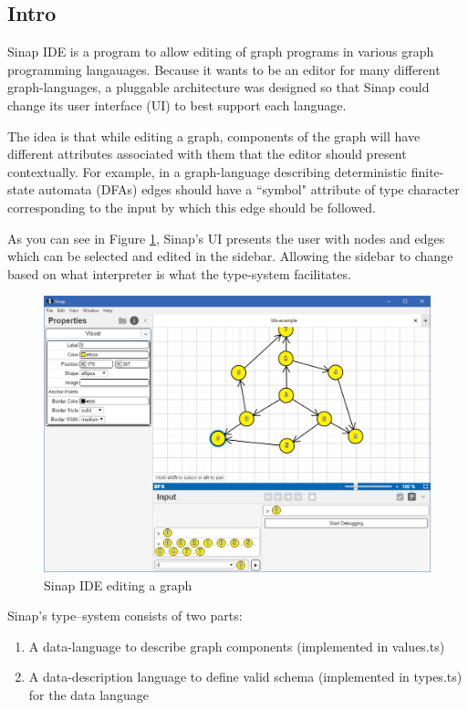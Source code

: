 \documentclass{article}
\begin{document}
\begin{multicols}{2}
\section{Intro}

Sinap IDE is a program to allow editing of graph
programs in various graph programming langauages. 
Because it wants to be an editor for many different
graph-languages, a pluggable architecture was designed
so that Sinap could change its user interface (UI)
to best support each language. 

The idea is that while editing a graph, components of the
graph will have different attributes associated with them 
that the editor should present contextually. For example, in
a graph-language describing deterministic finite-state 
automata (DFAs) edges should have a ``symbol" attribute of 
type character corresponding to the input by which this 
edge should be followed. 

As you can see in Figure \ref{sinap-screenshot}, Sinap's UI
presents the user with nodes and edges which can be selected 
and edited in the sidebar. Allowing the sidebar to change based
on what interpreter is what the type-system facilitates. 

\begin{figure} 
    \label{sinap-screenshot}  
    \includegraphics[width=\textwidth]{sinap-screenshot}
    \caption{Sinap IDE editing a graph}
\end{figure}
    
Sinap's type–system consists of two parts:

\begin{enumerate}
    \item A data-language to describe graph components 
    (implemented in values.ts)
    \item A data-description language to define valid schema 
    (implemented in types.ts)
    for the data language
\end{enumerate}


\end{multicols}
\end{document}
